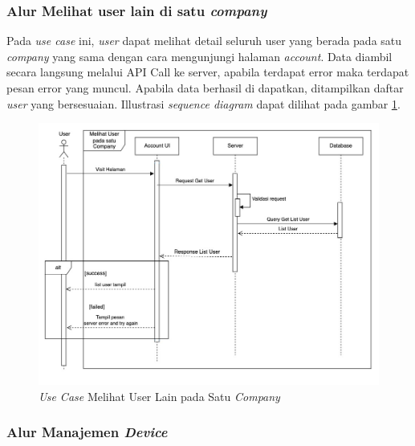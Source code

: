 \pagebreak

\subsubsection{Alur Melihat user lain di satu \textit{company}}

Pada \textit{use case} ini, \textit{user} dapat melihat detail seluruh user yang berada pada satu \textit{company} yang sama dengan cara mengunjungi halaman \textit{account}. Data diambil secara langsung melalui API Call ke server, apabila terdapat error maka terdapat pesan error yang muncul. Apabila data berhasil di dapatkan, ditampilkan daftar \textit{user} yang bersesuaian. Illustrasi \textit{sequence diagram} dapat dilihat pada gambar \ref{fig:usecase-07}.


\begin{figure}[ht]
  \centering
  \includegraphics[width=1\textwidth]{resources/chapter-3/usecase/uc-07.jpg}
  \caption{\textit{Use Case} Melihat User Lain pada Satu \textit{Company}}
  \label{fig:usecase-07}
\end{figure}

\pagebreak

\subsubsection{Alur Manajemen \textit{Device}}

